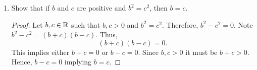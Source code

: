 \documentclass[12pt]{article}
\begin{document}
\begin{enumerate}[label=(\alph*)]
\begin{proof}
			Since $B \subset \RR$ is bounded above it has a least upper bound, call it $b$. Since $B$ contains
			at least one positive real number, $b > 0$. Assume for contradiction $b^2 < a$. Then, by 
			part by part (b) $(b + h)^2 < a$ for some $h > 0$. Thus, $b + h \in B$. This is a contradiction
			since $b + h > b$ and $b + h \in B$ cannot both be true given $b$ is the least upper bound
			of $B$. Thus, assume for contradiction $b^2 > a$. Then by part (b) there exists some $h > 0$
			such that $(b - h)^2 > a$. Thus, $b - h$ is an upper bound of $B$ while also $b - h < b$ which 
			is a contradiction given that $b$ is the least upper bound of $B$. Therefore, it must be
			that $b^2 = a$. 
		\end{proof}
		\item Show that if $b$ and $c$ are positive and $b^2 = c^2$, then $b = c$.
		\begin{proof}
			Let $b, c \in \mathbb{R}$ such that $b,c > 0$ and $b^2 = c^2$. Therefore, $b^2 - c^2 = 0$.
			Note $b^2 - c^2 = (b + c)(b - c)$. Thus,
			$$
			(b + c)(b - c) = 0.
			$$
			This implies either $b + c = 0$ or $b - c = 0$. Since $b, c > 0$ it must be $b + c > 0$.
			Hence, $b - c = 0$ implying $b = c$.
		\end{proof}
	\end{enumerate}
	
\end{document}
